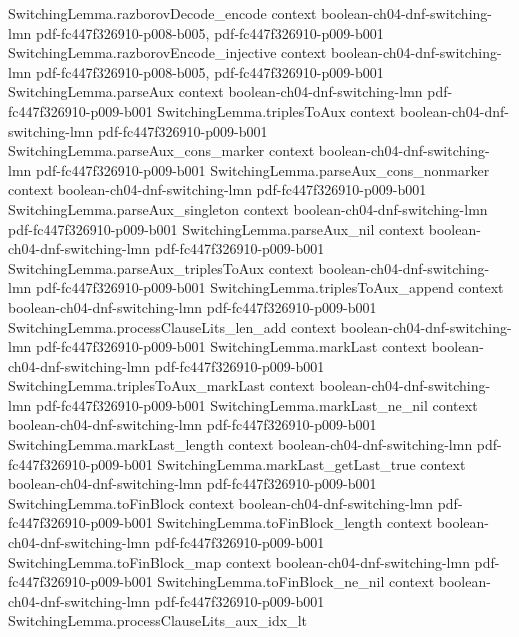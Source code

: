 \begin{lemma}
\proofstep
  {SwitchingLemma.razborovDecode_encode}
  {context}
  {boolean-ch04-dnf-switching-lmn}
  {pdf-fc447f326910-p008-b005,
    pdf-fc447f326910-p009-b001}
\proofstep
  {SwitchingLemma.razborovEncode_injective}
  {context}
  {boolean-ch04-dnf-switching-lmn}
  {pdf-fc447f326910-p008-b005,
    pdf-fc447f326910-p009-b001}
\proofstep
  {SwitchingLemma.parseAux}
  {context}
  {boolean-ch04-dnf-switching-lmn}
  {pdf-fc447f326910-p009-b001}
\proofstep
  {SwitchingLemma.triplesToAux}
  {context}
  {boolean-ch04-dnf-switching-lmn}
  {pdf-fc447f326910-p009-b001}
\proofstep
  {SwitchingLemma.parseAux_cons_marker}
  {context}
  {boolean-ch04-dnf-switching-lmn}
  {pdf-fc447f326910-p009-b001}
\proofstep
  {SwitchingLemma.parseAux_cons_nonmarker}
  {context}
  {boolean-ch04-dnf-switching-lmn}
  {pdf-fc447f326910-p009-b001}
\proofstep
  {SwitchingLemma.parseAux_singleton}
  {context}
  {boolean-ch04-dnf-switching-lmn}
  {pdf-fc447f326910-p009-b001}
\proofstep
  {SwitchingLemma.parseAux_nil}
  {context}
  {boolean-ch04-dnf-switching-lmn}
  {pdf-fc447f326910-p009-b001}
\proofstep
  {SwitchingLemma.parseAux_triplesToAux}
  {context}
  {boolean-ch04-dnf-switching-lmn}
  {pdf-fc447f326910-p009-b001}
\proofstep
  {SwitchingLemma.triplesToAux_append}
  {context}
  {boolean-ch04-dnf-switching-lmn}
  {pdf-fc447f326910-p009-b001}
\proofstep
  {SwitchingLemma.processClauseLits_len_add}
  {context}
  {boolean-ch04-dnf-switching-lmn}
  {pdf-fc447f326910-p009-b001}
\proofstep
  {SwitchingLemma.markLast}
  {context}
  {boolean-ch04-dnf-switching-lmn}
  {pdf-fc447f326910-p009-b001}
\proofstep
  {SwitchingLemma.triplesToAux_markLast}
  {context}
  {boolean-ch04-dnf-switching-lmn}
  {pdf-fc447f326910-p009-b001}
\proofstep
  {SwitchingLemma.markLast_ne_nil}
  {context}
  {boolean-ch04-dnf-switching-lmn}
  {pdf-fc447f326910-p009-b001}
\proofstep
  {SwitchingLemma.markLast_length}
  {context}
  {boolean-ch04-dnf-switching-lmn}
  {pdf-fc447f326910-p009-b001}
\proofstep
  {SwitchingLemma.markLast_getLast_true}
  {context}
  {boolean-ch04-dnf-switching-lmn}
  {pdf-fc447f326910-p009-b001}
\proofstep
  {SwitchingLemma.toFinBlock}
  {context}
  {boolean-ch04-dnf-switching-lmn}
  {pdf-fc447f326910-p009-b001}
\proofstep
  {SwitchingLemma.toFinBlock_length}
  {context}
  {boolean-ch04-dnf-switching-lmn}
  {pdf-fc447f326910-p009-b001}
\proofstep
  {SwitchingLemma.toFinBlock_map}
  {context}
  {boolean-ch04-dnf-switching-lmn}
  {pdf-fc447f326910-p009-b001}
\proofstep
  {SwitchingLemma.toFinBlock_ne_nil}
  {context}
  {boolean-ch04-dnf-switching-lmn}
  {pdf-fc447f326910-p009-b001}
\proofstep
  {SwitchingLemma.processClauseLits_aux_idx_lt}

\end{lemma}
